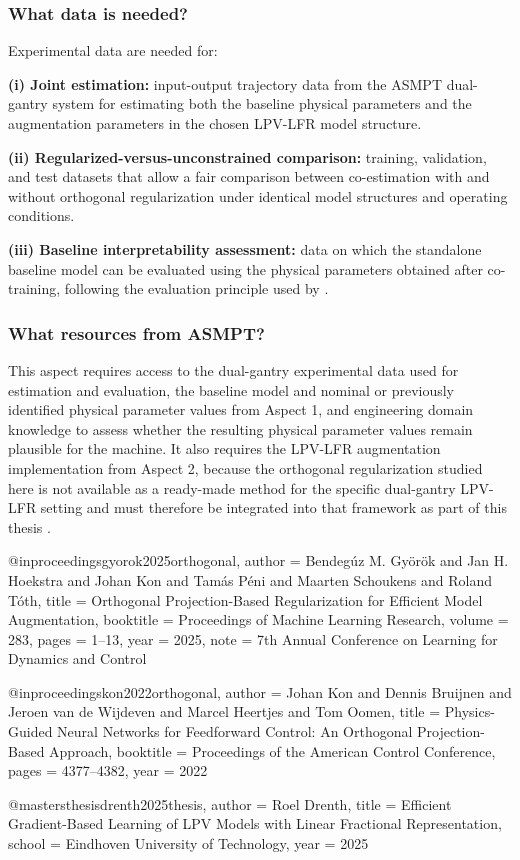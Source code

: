 \subsubsection{What data is needed?}

Experimental data are needed for:

\textbf{(i) Joint estimation:} input-output trajectory data from the ASMPT dual-gantry system for estimating both the baseline physical parameters and the augmentation parameters in the chosen LPV-LFR model structure.

\textbf{(ii) Regularized-versus-unconstrained comparison:} training, validation, and test datasets that allow a fair comparison between co-estimation with and without orthogonal regularization under identical model structures and operating conditions.

\textbf{(iii) Baseline interpretability assessment:} data on which the standalone baseline model can be evaluated using the physical parameters obtained after co-training, following the evaluation principle used by \citet{gyorok2025orthogonal}.

\subsubsection{What resources from ASMPT?}

This aspect requires access to the dual-gantry experimental data used for estimation and evaluation, the baseline model and nominal or previously identified physical parameter values from Aspect 1, and engineering domain knowledge to assess whether the resulting physical parameter values remain plausible for the machine. It also requires the LPV-LFR augmentation implementation from Aspect 2, because the orthogonal regularization studied here is not available as a ready-made method for the specific dual-gantry LPV-LFR setting and must therefore be integrated into that framework as part of this thesis \citep{drenth2025thesis}.


@inproceedings{gyorok2025orthogonal,
  author    = {Bendeg{\'u}z M. Gy{\"o}r{\"o}k and Jan H. Hoekstra and Johan Kon and Tam{\'a}s P{\'e}ni and Maarten Schoukens and Roland T{\'o}th},
  title     = {Orthogonal Projection-Based Regularization for Efficient Model Augmentation},
  booktitle = {Proceedings of Machine Learning Research},
  volume    = {283},
  pages     = {1--13},
  year      = {2025},
  note      = {7th Annual Conference on Learning for Dynamics and Control}
}

@inproceedings{kon2022orthogonal,
  author    = {Johan Kon and Dennis Bruijnen and Jeroen van de Wijdeven and Marcel Heertjes and Tom Oomen},
  title     = {Physics-Guided Neural Networks for Feedforward Control: An Orthogonal Projection-Based Approach},
  booktitle = {Proceedings of the American Control Conference},
  pages     = {4377--4382},
  year      = {2022}
}

@mastersthesis{drenth2025thesis,
  author = {Roel Drenth},
  title  = {Efficient Gradient-Based Learning of LPV Models with Linear Fractional Representation},
  school = {Eindhoven University of Technology},
  year   = {2025}
}